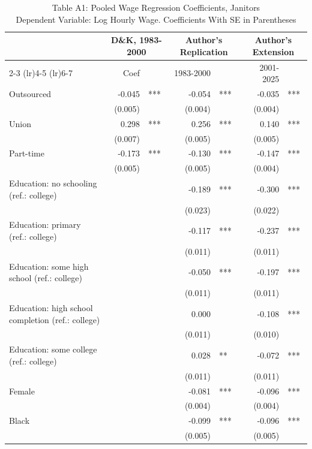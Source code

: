 \begin{table}[!t]
\caption*{
{\large Table A1: Pooled Wage Regression Coefficients, Janitors} \\
{\small Dependent Variable: Log Hourly Wage. Coefficients With SE in Parentheses}
} 

\fontsize{10.0pt}{12.0pt}\selectfont

\centering\begin{tabular}{l|rlrl|rl}
\toprule
  & \multicolumn{2}{c}{D\&K, 1983-2000} & \multicolumn{2}{c}{Author's Replication} & \multicolumn{2}{c}{Author's Extension} \\ 
\cmidrule(lr){2-3} \cmidrule(lr){4-5} \cmidrule(lr){6-7}
  & Coef &  & 1983-2000 &  & 2001-2025 &  \\ 
\midrule\addlinespace[2.5pt]
Outsourced & -0.045 & *** & -0.054 & *** & -0.035 & *** \\
 & (0.005) &  & (0.004) &  & (0.004) &  \\
Union & 0.298 & *** & 0.256 & *** & 0.140 & *** \\
 & (0.007) &  & (0.005) &  & (0.005) &  \\
Part-time & -0.173 & *** & -0.130 & *** & -0.147 & *** \\
 & (0.005) &  & (0.005) &  & (0.004) &  \\
Education: no schooling (ref.: college) &  &  & -0.189 & *** & -0.300 & *** \\
 &  &  & (0.023) &  & (0.022) &  \\
Education: primary (ref.: college) &  &  & -0.117 & *** & -0.237 & *** \\
 &  &  & (0.011) &  & (0.011) &  \\
Education: some high school (ref.: college) &  &  & -0.050 & *** & -0.197 & *** \\
 &  &  & (0.011) &  & (0.011) &  \\
Education: high school completion (ref.: college) &  &  & 0.000 &  & -0.108 & *** \\
 &  &  & (0.011) &  & (0.010) &  \\
Education: some college (ref.: college) &  &  & 0.028 & ** & -0.072 & *** \\
 &  &  & (0.011) &  & (0.011) &  \\
Female &  &  & -0.081 & *** & -0.096 & *** \\
 &  &  & (0.004) &  & (0.004) &  \\
Black &  &  & -0.099 & *** & -0.096 & *** \\
 &  &  & (0.005) &  & (0.005) &  \\

\end{tabular}
\end{table}
